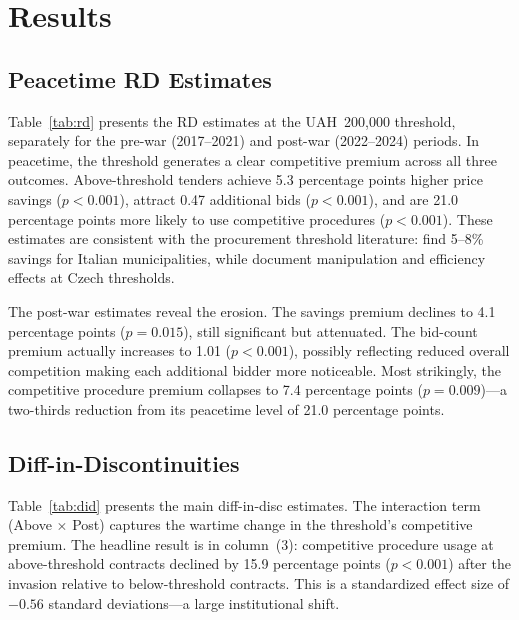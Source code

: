 \documentclass[12pt]{article}
\begin{document}
\section{Results}

\subsection{Peacetime RD Estimates}



Table~\ref{tab:rd} presents the RD estimates at the UAH~200,000 threshold, separately for the pre-war (2017--2021) and post-war (2022--2024) periods. In peacetime, the threshold generates a clear competitive premium across all three outcomes. Above-threshold tenders achieve 5.3 percentage points higher price savings ($p < 0.001$), attract 0.47 additional bids ($p < 0.001$), and are 21.0 percentage points more likely to use competitive procedures ($p < 0.001$). These estimates are consistent with the procurement threshold literature: \citet{Coviello2014} find 5--8\% savings for Italian municipalities, while \citet{Palguta2017} document manipulation and efficiency effects at Czech thresholds.

The post-war estimates reveal the erosion. The savings premium declines to 4.1 percentage points ($p = 0.015$), still significant but attenuated. The bid-count premium actually increases to 1.01 ($p < 0.001$), possibly reflecting reduced overall competition making each additional bidder more noticeable. Most strikingly, the competitive procedure premium collapses to 7.4 percentage points ($p = 0.009$)---a two-thirds reduction from its peacetime level of 21.0 percentage points.

\subsection{Diff-in-Discontinuities}



Table~\ref{tab:did} presents the main diff-in-disc estimates. The interaction term (Above $\times$ Post) captures the wartime change in the threshold's competitive premium. The headline result is in column~(3): competitive procedure usage at above-threshold contracts declined by 15.9 percentage points ($p < 0.001$) after the invasion relative to below-threshold contracts. This is a standardized effect size of $-0.56$ standard deviations---a large institutional shift.
\end{document}
